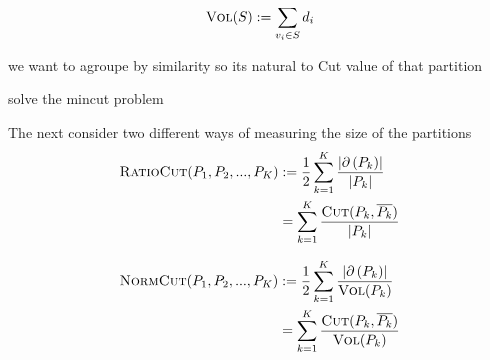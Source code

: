 	\begin{displaymath}
		\textsc{Vol}(S) :=  \sum_{v_i \in S} d_i 
	\end{displaymath}

 
we want to agroupe by similarity so its natural to 
Cut value of that partition

solve the mincut problem

The next consider two different ways of measuring the size of the partitions
\begin{align*}
	\textsc{RatioCut}(P_1, P_2, ..., P_K) &:= \frac{1}{2} \sum_{k=1}^K \frac{\left|\partial\left(P_k\right)\right|}{\left| P_k \right|} \\
	&= \sum_{k=1}^K \frac{\textsc{Cut}(P_k, \overline{P_k})}{\left| P_k \right|}
\end{align*}

\begin{align*}
	\textsc{NormCut}(P_1, P_2, ..., P_K) & := \frac{1}{2} \sum_{k=1}^K \frac{\left|\partial\left(P_k\right)\right|}{\textsc{Vol}(P_k)}\\
	&= \sum_{k=1}^K \frac{\textsc{Cut}(P_k, \overline{P_k})}{\textsc{Vol}(P_k)}
\end{align*}

